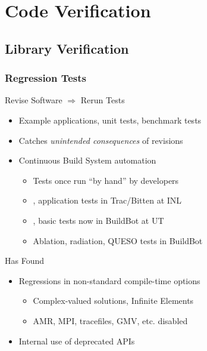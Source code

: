 \section{Code Verification}

\subsection{Library Verification}

\begin{frame}
\frametitle{Regression Tests}
\begin{block}{Revise Software $\Rightarrow$ Rerun Tests}
\begin{itemize}
\item Example applications, unit tests, benchmark tests
\item Catches {\textit{unintended consequences}} of revisions
\item Continuous Build System automation
\begin{itemize}
\item Tests once run ``by hand'' by \libMesh{} developers
\item \libMesh, application tests in Trac/Bitten at INL
\item \libMesh, \FINS{} basic tests now in BuildBot at UT
\item Ablation, radiation, QUESO tests in BuildBot
\end{itemize}
\end{itemize}
\end{block}

\pause

\begin{block}{Has Found}
\begin{itemize}
\item Regressions in non-standard compile-time options
  \begin{itemize}
  \item Complex-valued solutions, Infinite Elements
  \item AMR, MPI, tracefiles, GMV, etc. disabled
  \end{itemize}
\item Internal use of deprecated APIs
\end{itemize}
\end{block}
\end{frame}


